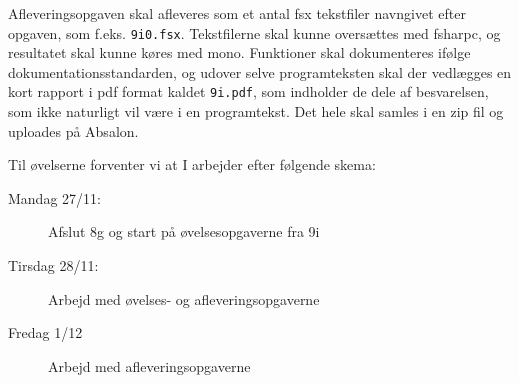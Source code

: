 \documentclass[a4paper,12pt]{article}
\begin{document}
Afleveringsopgaven skal afleveres som et antal fsx tekstfiler navngivet efter opgaven, som f.eks. \lstinline!9i0.fsx!. Tekstfilerne skal kunne oversættes med fsharpc, og resultatet skal kunne køres med mono. Funktioner skal dokumenteres ifølge dokumentationsstandarden, og udover selve programteksten skal der vedlægges en kort rapport i pdf format kaldet \lstinline{9i.pdf}, som indholder de dele af besvarelsen, som ikke naturligt vil være i en programtekst. Det hele skal samles i en zip fil og uploades på Absalon.

Til øvelserne forventer vi at I arbejder efter følgende skema:
\begin{description}
\item[Mandag 27/11:] Afslut 8g og start på øvelsesopgaverne fra 9i
\item[Tirsdag 28/11:] Arbejd med øvelses- og afleveringsopgaverne
\item[Fredag 1/12]  Arbejd med afleveringsopgaverne
\end{description}
\end{document}

